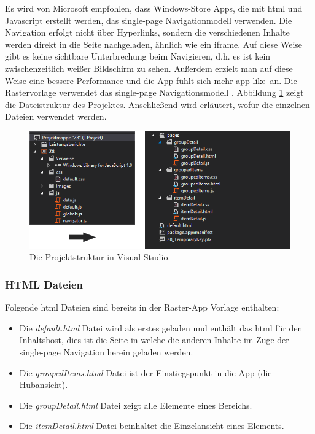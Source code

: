 \documentclass[12pt,a4paper,bibtotoc,abstracton]{scrartcl}
\begin{document}
Es wird von Microsoft empfohlen, dass Windows-Store Apps, die mit \ac{html} und Javascript erstellt werden, das single-page Navigationmodell verwenden. Die Navigation erfolgt nicht über Hyperlinks, sondern die verschiedenen Inhalte werden direkt in die Seite nachgeladen, ähnlich wie ein iframe. Auf diese Weise gibt es keine sichtbare Unterbrechung beim Navigieren, d.h. es ist kein zwischenzeitlich weißer Bildschirm zu sehen. Außerdem erzielt man auf diese Weise eine bessere Performance und die App fühlt sich mehr \glqq app-like\grqq\ an. Die Rastervorlage verwendet das single-page Navigationsmodell \citep{MicrosoftSinglePage2013}. Abbildung \ref{fig:projektmappe} zeigt die Dateistruktur des Projektes. Anschließend wird erläutert, wofür die einzelnen Dateien verwendet werden.

\begin{figure}[h]
	\centering
	\includegraphics[width=\textwidth]{Bilder/Screenshots/app/projektmappe.png} 
	\caption{Die Projektstruktur in Visual Studio.}
	\label{fig:projektmappe}
\end{figure}

\subsubsection{HTML Dateien}
\label{subsubsec:htmldateien} 
Folgende \ac{html} Dateien sind bereits in der Raster-App Vorlage enthalten:
\begin{itemize}
	\item Die \textit{default.html} Datei wird als erstes geladen und enthält das \ac{html} für den Inhaltshost, dies ist die Seite in welche die anderen Inhalte im Zuge der single-page Navigation herein geladen werden.
	\item Die \textit{groupedItems.html} Datei ist der Einstiegspunkt in die App (die Hubansicht).
	\item Die \textit{groupDetail.html} Datei zeigt alle Elemente eines Bereichs.
	\item Die \textit{itemDetail.html} Datei beinhaltet die Einzelansicht eines Elements.
\end{itemize}
\end{document}
